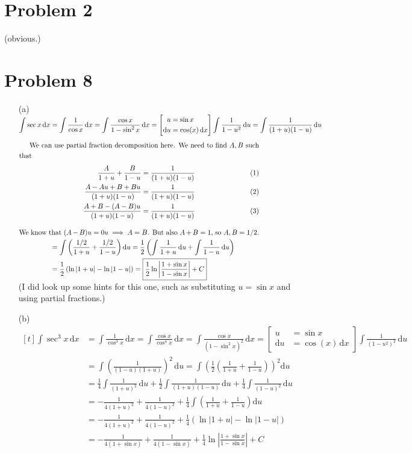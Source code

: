 \documentclass[preview, margin=0.6in]{standalone}
\newcommand{\alignedintertext}[1]{%
  \noalign{%
    \vskip\belowdisplayshortskip
    \vtop{\hsize=\linewidth#1\par
    \expandafter}%
    \expandafter\prevdepth\the\prevdepth
  }%
}
\newcommand*{\problem}[1]{\section*{Problem #1}}
\begin{document}
\problem{2}
 (obvious.)

\problem{8}
\begin{itemize}
	\item[(a)]
		$\begin{aligned}[t]
		    \int \sec x\,\mathrm{d}x
			&=\int \frac{1}{\cos x}\,\mathrm{d}x
			=\int \frac{\cos x}{1-\sin^2x}\,\mathrm{d}x
			=\left[ \begin{aligned}
				u&=\sin x \\				
				\mathrm{d}u&=\cos(x)\,\mathrm{d}x
			\end{aligned} \right]
			\int \frac{1}{1-u^2}\,\mathrm{d}u
			=\int \frac{1}{(1+u)(1-u)}\,\mathrm{d}u \\
			\alignedintertext{We can use partial fraction decomposition here. We need to find $A,B$ such that	\begin{align*}
				\frac{A}{1+u}+\frac{B}{1-u}&=\frac{1}{(1+u)(1-u)} \\
				\frac{A-Au+B+Bu}{(1+u)(1-u)}&=\frac{1}{(1+u)(1-u)} \\
				\frac{A+B-(A-B)u}{(1+u)(1-u)}&=\frac{1}{(1+u)(1-u)}
			\end{align*}
			We know that $(A-B)u=0u\implies A=B$. But also $A+B=1$, so $A,B=1/2$.}
			&=\int\left(\frac{1/2}{1+u}+\frac{1/2}{1-u}\right)\mathrm{d}u
			=\frac12 \left(\int \frac{1}{1+u}\,\mathrm{d}u+\int \frac{1}{1-u}\,\mathrm{d}u\right) \\
			&=\frac12 \left(\ln|1+u|-\ln|1-u|\right)
			=\boxed{\frac12 \ln \left|\frac{1+\sin x}{1-\sin x}\right|+C}
		\end{aligned}$
		(I did look up some hints for this one, such as substituting $u=\sin x$ and using partial fractions.)
		
	\item[(b)]
		$\begin{aligned}[t]
		    \int \sec^3x\,\mathrm{d}x
			&=\int \frac{1}{\cos^3x}\,\mathrm{d}x
			=\int \frac{\cos x}{\cos^4x}\,\mathrm{d}x
			=\int \frac{\cos x}{\left(1-\sin^2x\right)^2}\,\mathrm{d}x
			=\left[ \begin{aligned}
				u&=\sin x \\				
				\mathrm{d}u&=\cos(x)\,\mathrm{d}x
			\end{aligned} \right]
			\int \frac{1}{(1-u^2)^2}\,\mathrm{d}u \\
			&=\int \left(\frac{1}{(1-u)(1+u)}\right)^2\,\mathrm{d}u
			=\int\left(\frac12\left(\frac{1}{1+u}+\frac{1}{1-u}\right)\right)^2\mathrm{d}u \\
			&=\frac14 \int \frac{1}{(1+u)^2}\,\mathrm{d}u+\frac12 \int \frac{1}{(1+u)(1-u)}\,\mathrm{d}u+\frac14 \int \frac{1}{(1-u)^2}\,\mathrm{d}u \\
			&=-\frac{1}{4(1+u)^2}+\frac{1}{4(1-u)^2}+\frac14 \int\left(\frac{1}{1+u}+\frac{1}{1-u}\right)\mathrm{d}u \\
			&=-\frac{1}{4(1+u)^2}+\frac{1}{4(1-u)^2}+\frac14(\ln|1+u|-\ln|1-u|) \\
			&=\boxed{-\frac{1}{4(1+\sin x)}+\frac{1}{4(1-\sin x)}+\frac14\ln \left|\frac{1+\sin x}{1-\sin x}\right|+C}
		\end{aligned}$

\end{itemize}
\end{document}
